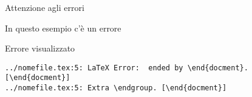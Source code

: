 \begin{frame}[fragile]{Attenzione agli errori}

\begin{exampleblock}{In questo esempio c'è un errore}
	
\end{exampleblock}

\pause

\begin{alertblock}{Errore visualizzato}
	\begin{lstlisting}
../nomefile.tex:5: LaTeX Error:  ended by \end{docment}. [\end{docment}]
../nomefile.tex:5: Extra \endgroup. [\end{docment}]
	\end{lstlisting}
\end{alertblock}

\end{frame}